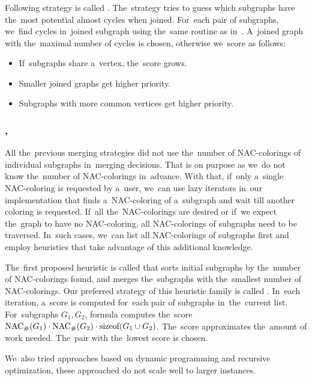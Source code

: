 \subsubsection*{\PromisingCycles{}}

Following strategy is called \PromisingCycles{}.
The~strategy tries to guess which subgraphs
have the~most potential almost cycles when joined.
For~each pair of subgraphs, we~find cycles in~joined subgraph using
the~same routine as in~.
A~joined graph with the~maximal number of cycles is chosen,
otherwise we~score as follows:
%
\begin{itemize}
	\item If~subgraphs share a~vertex, the~score grows.
	\item Smaller joined graphs get higher priority.
	\item Subgraphs with more common vertices get higher priority.
\end{itemize}
%

\subsubsection*{\SortedSize{}, \Score{}}

All the~previous merging strategies did not use the~number of NAC-colorings
of individual subgraphs in~merging decisions.
That is on purpose as we~do not know the~number of NAC-colorings in~advance.
With that, if~only a~single NAC-coloring is requested by a~user,
we~can use lazy iterators in~our implementation that
finds a~NAC-coloring of a~subgraph and wait till another coloring is requested.
If~all the~NAC-colorings are desired or if~we expect the~graph to have no NAC-coloring,
all NAC-colorings of subgraphs need to be traversed.
In~such cases, we~can list all NAC-colorings of subgraphs first
and employ heuristics that take advantage of this additional knowledge.

The~first proposed heuristic is called \SortedSize{}
that sorts initial subgraphs by the~number of NAC-colorings found,
and merges the~subgraphs with the~smallest number of NAC-colorings.
%
Our preferred strategy of this heuristic family is called \Score{}.
In~each iteration, a~score is computed for~each pair of subgraphs in~the~current list.
For~subgraphs \( G_1, G_2 \), formula computes the~score
\( \operatorname{NAC}_{\#} (G_1) \cdot \operatorname{NAC}_{\#} (G_2) \cdot \text{sizeof}(G_1 \cup G_2) \).
The~score approximates the~amount of work needed.
The~pair with the~lowest score is chosen.

We~also tried approaches based on dynamic programming and recursive optimization,
these approached do not scale well to larger instances.

